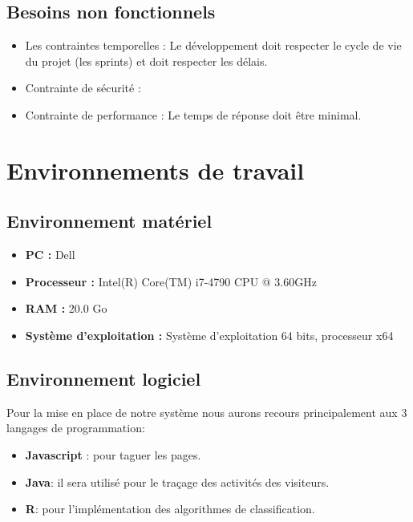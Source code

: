 \subsection{Besoins non fonctionnels }

\begin{itemize}
    \item Les contraintes temporelles : Le développement doit respecter le cycle de vie du projet (les sprints) et doit respecter les délais.
    
    \item Contrainte de sécurité : 
    
    \item Contrainte de performance : Le temps de réponse doit être minimal.
\end{itemize}

\section{Environnements de travail }
\subsection{Environnement matériel }

\begin{itemize}
    \item {\textbf{PC :}} Dell
    \item {\textbf{Processeur :}} Intel(R) Core(TM) i7-4790 CPU @ 3.60GHz
    \item {\textbf{RAM :}} 20.0 Go
    \item {\textbf{Système d'exploitation :}} Système d'exploitation 64 bits, processeur x64

\end{itemize}
  \subsection{Environnement logiciel }  
  Pour la mise en place de notre système nous aurons recours principalement aux 3 langages de programmation:
  \begin{itemize}
      \item \textbf{Javascript} : pour taguer les pages. 
      \item \textbf{Java}: il sera utilisé pour le traçage des activités des visiteurs.
      \item \textbf{R}: pour l'implémentation des algorithmes de classification.
  \end{itemize}
  
